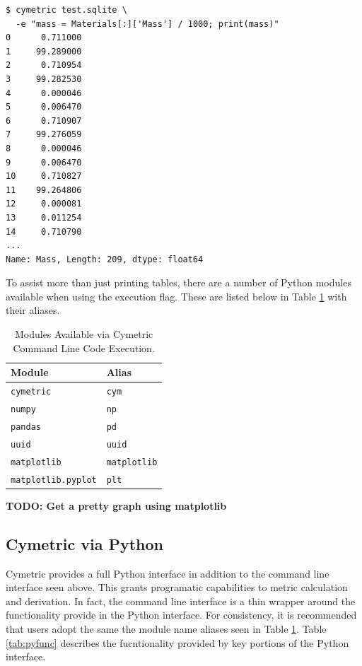 \documentclass{anstrans}
\newcommand{\TODO}[1] {{\color{red}\textbf{TODO: #1}}}
\newcommand{\code}[1]{{\color{code}\texttt{#1}}}
\begin{document}
\begin{lstlisting}[caption ={Calculating and Manipulating Metrics}, label=mass]
$ cymetric test.sqlite \
  -e "mass = Materials[:]['Mass'] / 1000; print(mass)"
0      0.711000
1     99.289000
2      0.710954
3     99.282530
4      0.000046
5      0.006470
6      0.710907
7     99.276059
8      0.000046
9      0.006470
10     0.710827
11    99.264806
12     0.000081
13     0.011254
14     0.710790
...
Name: Mass, Length: 209, dtype: float64
\end{lstlisting}

To assist more than just printing tables, there are a number of Python 
modules available when using the execution flag. These are listed below 
in Table \ref{tab:modules} with their aliases.

\begin{table}[htb]
\centering
\caption{Modules Available via Cymetric Command Line Code Execution.}
\begin{tabular}{ll}
\toprule
  Module                   & Alias \\
\midrule
  \code{cymetric}          & \code {cym} \\
  \code{numpy}             & \code{np} \\  
  \code{pandas}            & \code{pd} \\
  \code{uuid}              & \code{uuid} \\
  \code{matplotlib}        & \code{matplotlib} \\
  \code{matplotlib.pyplot} & \code{plt} \\
\bottomrule
\end{tabular}
  \label{tab:modules}
\end{table}

\TODO{Get a pretty graph using matplotlib}

\subsection{Cymetric via Python}
Cymetric provides a full Python interface in addition to the command line 
interface seen above. This grants programatic capabilities to metric 
calculation and derivation. In fact, the command line interface is a thin
wrapper around the functionality provide in the Python interface.
For consistency, it is recommended that users adopt the same the module name 
aliases seen in Table \ref{tab:modules}. 
Table \ref{tab:pyfunc} describes the fucntionality provided by key 
portions of the Python interface.
\end{document}
